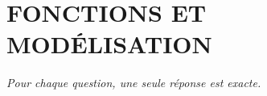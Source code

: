 
\section*{\textcolor{chapcolor}{\MakeUppercase{Fonctions et modélisation}}}

\begin{center}
\textit{Pour chaque question, une seule réponse est exacte.}
\end{center}

